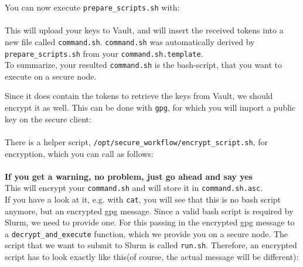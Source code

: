 \documentclass[paper=a4]{scrartcl}
\begin{document}
You can now execute \texttt{prepare\_scripts.sh} with: \\
 \\
This will upload your keys to Vault, and will insert the received tokens into a new file called \texttt{command.sh}. 
\texttt{command.sh} was automatically derived by \texttt{prepare\_scripts.sh} from your \texttt{command.sh.template}. 
\\
To summarize, your resulted \texttt{command.sh} is the bash-script,  that you want to execute on a secure node. 


Since it does contain the tokens to retrieve the keys from Vault, we should encrypt it as well. 
This can be done with \texttt{gpg}, for which you will import a public key on the secure client: \\
\\
There is a helper script,  \texttt{/opt/secure\_workflow/encrypt\_script.sh}, for encryption, which you can call as follows: \\
 \\
\textbf{If you get a warning, no problem, just go ahead and say yes} \\
This will encrypt your \texttt{command.sh} and will store it in \texttt{command.sh.asc}. 
\\
If you have a look at it, e.g. with \texttt{cat}, you will see that this is no bash script anymore, but an encrypted gpg message.
Since a valid bash script is required by Slurm, we need to provide one. 
For this passing in the encrypted gpg message to a \texttt{decrypt\_and\_execute} function, which we provide you on a secure node. 
The script that we want to submit to Slurm is called \texttt{run.sh}. 
Therefore, an encrypted script has to look exactly like this(of course, the actual message will be different): \\
\end{document}
